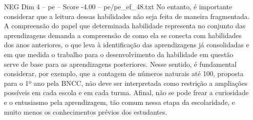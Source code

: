 \begin{textsample}{NEG Dim 4 – pe – Score -4.00 – pe/pe\_ef\_48.txt}
No entanto, é importante considerar que a leitura dessas habilidades não seja feita de maneira fragmentada.
A compreensão do papel que determinada habilidade representa no conjunto das aprendizagens demanda a compreensão de como ela se conecta com habilidades dos anos anteriores, o que leva à identificação das aprendizagens já consolidadas e em que medida o trabalho para o desenvolvimento da habilidade em questão serve de base para as aprendizagens posteriores.
Nesse sentido, é fundamental considerar, por exemplo, que a contagem de números naturais até 100, proposta para o 1º ano pela BNCC, não deve ser interpretada como restrição a ampliações possíveis em cada escola e em cada turma.
Afinal, não se pode frear a curiosidade e o entusiasmo pela aprendizagem, tão comum nessa etapa da escolaridade, e muito menos os conhecimentos prévios dos estudantes.

\end{textsample}
